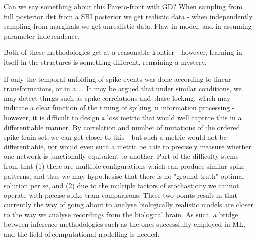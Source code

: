 \documentclass[mphil,deptreport,ai]{infthesis} %
\begin{document}
Can we say something about this Pareto-front with GD?
When sampling from full posterior dist from a SBI posterior we get realistic data - when independently sampling from marginals we get unrealistic data. Flaw in model, and in assuming parameter independence.

Both of these methodologies get at a reasonable frontier - however, learning in itself in the structures is something different, remaining a mystery.


If only the temporal unfolding of spike events was done according to linear transformations, or in a ...
It may be argued that under similar conditions, we may detect things such as spike correlations and phase-locking, which may indicate a clear function of the timing of spiking in information processing - however, it is difficult to design a loss metric that would well capture this in a differentiable manner.
By correlation and number of mutations of the ordered spike train set, we can get closer to this - but such a metric would not be differentiable, nor would even such a metric be able to precisely measure whether one network is functionally equivalent to another.
Part of the difficulty stems from that (1) there are multiple configurations which can produce similar spike patterns, and thus we may hypothesise that there is no "ground-truth" optimal solution per se, and (2) due to the multiple factors of stochasticity we cannot operate with precise spike train comparisons. These two points result in that currently the way of going about to analyse biologically realistic models are closer to the way we analyse recordings from the biological brain. As such, a bridge between inference methodologies such as the ones successfully employed in ML, and the field of computational modelling is needed.







% 
% 
% 
\end{document}
